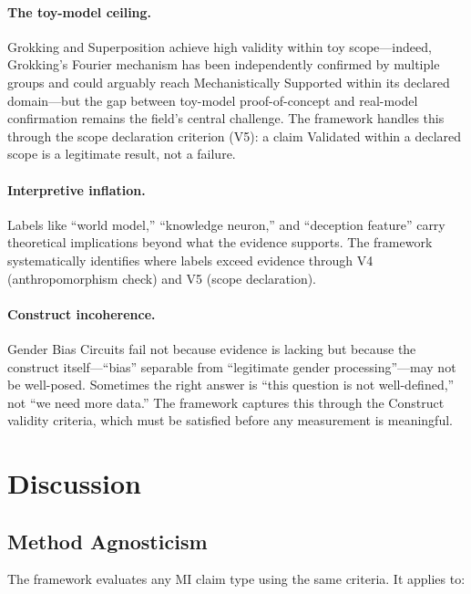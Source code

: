 \documentclass[10pt]{article}
\begin{document}
\paragraph{The toy-model ceiling.} Grokking and Superposition achieve high validity within toy scope---indeed, Grokking's Fourier mechanism has been independently confirmed by multiple groups and could arguably reach Mechanistically Supported within its declared domain---but the gap between toy-model proof-of-concept and real-model confirmation remains the field's central challenge. The framework handles this through the scope declaration criterion (V5): a claim Validated within a declared scope is a legitimate result, not a failure.

\paragraph{Interpretive inflation.} Labels like ``world model,'' ``knowledge neuron,'' and ``deception feature'' carry theoretical implications beyond what the evidence supports. The framework systematically identifies where labels exceed evidence through V4 (anthropomorphism check) and V5 (scope declaration).

\paragraph{Construct incoherence.} Gender Bias Circuits fail not because evidence is lacking but because the construct itself---``bias'' separable from ``legitimate gender processing''---may not be well-posed. Sometimes the right answer is ``this question is not well-defined,'' not ``we need more data.'' The framework captures this through the Construct validity criteria, which must be satisfied before any measurement is meaningful.

\section{Discussion}
\label{sec:discussion}

\subsection{Method Agnosticism}

The framework evaluates any MI claim type using the same criteria. It applies to:
\end{document}

